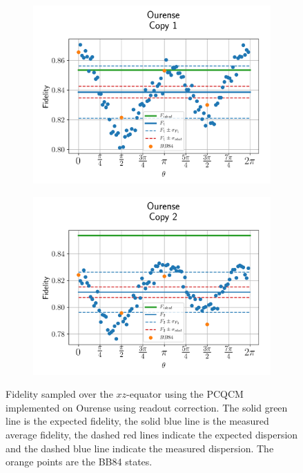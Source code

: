 \begin{figure}[H]
  \centering
  \begin{subfigure}{.5\textwidth}
    \centering
    \includegraphics[width=\textwidth]{Figures/PhaseCovariant/IBM/OnlyEquator/results_corrected_ourense_copy1.png}
    \label{fig:pc_corrected_ourense_equator_1}
  \end{subfigure}%
  \begin{subfigure}{.5\textwidth}
    \centering
    \includegraphics[width=\textwidth]{Figures/PhaseCovariant/IBM/OnlyEquator/results_corrected_ourense_copy2.png}
    \label{fig:pc_corrected_ourense_equator_2}
  \end{subfigure}
  \vspace{-0.5cm}
  \caption{Fidelity sampled over the $xz$-equator using the PCQCM implemented on Ourense using readout correction. The solid green line is the expected fidelity, the solid blue line is the measured average fidelity, the dashed red lines indicate the expected dispersion and the dashed blue line indicate the measured dispersion. The orange points are the BB84 states.}
  \label{fig:pc_corrected_ourense_equator}
\end{figure}


